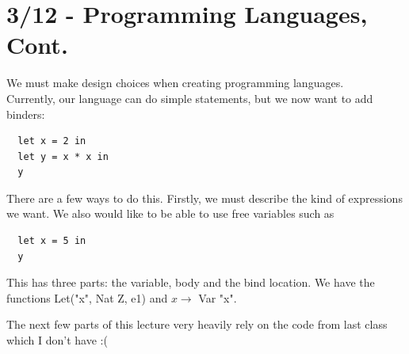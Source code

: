 \section{3/12 - Programming Languages, Cont.}
We must make design choices when creating programming languages. 
\\
Currently, our language can do simple statements, but we now want to add binders:
\begin{lstlisting}
  let x = 2 in 
  let y = x * x in
  y
\end{lstlisting}
There are a few ways to do this. Firstly, we must describe the kind of expressions we want. We also would like to be able to use free variables such as
\begin{lstlisting}
  let x = 5 in 
  y
\end{lstlisting}
This has three parts: the variable, body and the bind location. We have the functions Let("x", Nat Z, e1) and $x \to$ Var "x". 

\begin{note}
The next few parts of this lecture very heavily rely on the code from last class which I don't have :(
\end{note}